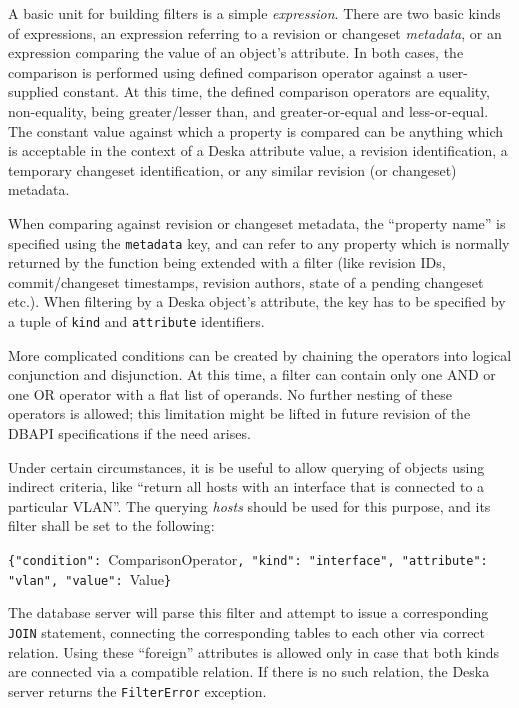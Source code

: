 \documentclass{article}
\begin{document}
A basic unit for building filters is a simple {\em expression}.  There are two basic kinds of expressions, an expression
referring to a revision or changeset {\em metadata}, or an expression comparing the value of an object's attribute.  In
both cases, the comparison is performed using defined comparison operator against a user-supplied constant.  At this
time, the defined comparison operators are equality, non-equality, being greater/lesser than, and greater-or-equal and
less-or-equal.  The constant value against which a property is compared can be anything which is acceptable in the
context of a Deska attribute value, a revision identification, a temporary changeset identification, or any similar
revision (or changeset) metadata.

When comparing against revision or changeset metadata, the ``property name'' is specified using the {\tt metadata} key,
and can refer to any property which is normally returned by the function being extended with a filter (like revision
IDs, commit/changeset timestamps, revision authors, state of a pending changeset etc.).  When filtering by a Deska
object's attribute, the key has to be specified by a tuple of {\tt kind} and {\tt attribute} identifiers.

More complicated conditions can be created by chaining the operators into logical conjunction and disjunction.  At this
time, a filter can contain only one AND or one OR operator with a flat list of operands. No further nesting of these
operators is allowed; this limitation might be lifted in future revision of the DBAPI specifications if the need
arises.

Under certain circumstances, it is be useful to allow querying of objects using indirect criteria, like ``return all
hosts with an interface that is connected to a particular VLAN''.  The  querying {\em
hosts} should be used for this purpose, and its filter shall be set to the following:

{\tt \{"condition": }ComparisonOperator{\tt, "kind": "interface", "attribute": "vlan", "value": }Value{\tt \}}

The database server will parse this filter and attempt to issue a corresponding {\tt JOIN} statement, connecting the
corresponding tables to each other via correct relation.  Using these
``foreign'' attributes is allowed only in case that both kinds are connected via a compatible relation.  If there is no
such relation, the Deska server returns the {\tt FilterError} exception.
\end{document}
